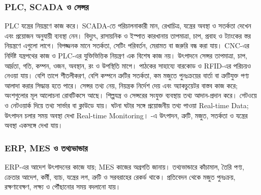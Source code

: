 \subsubsection{PLC, SCADA ও সেন্সর}
PLC যন্ত্রের নিয়ন্ত্রণে কাজ করে। SCADA-তে পরিচালনাকারী মান, রেখাচিত্র, যন্ত্রের অবস্থা ও সতর্কতা দেখেন এবং প্রয়োজন অনুযায়ী ব্যবস্থা নেন। বিদ্যুৎ, রাসায়নিক ও ইস্পাত কারখানায় তাপমাত্রা, চাপ, প্রবাহ ও ট্যাংকের স্তর নিয়ন্ত্রণে এগুলো লাগে। বিপজ্জনক মানে সতর্কতা, সেটিং পরিবর্তন, মেরামত বা জরুরি বন্ধ করা যায়। CNC-এর নির্দিষ্ট যন্ত্রপথের কাজ ও PLC-এর যুক্তিভিত্তিক নিয়ন্ত্রণ এক বিশেষ কাজ নয়।
উৎপাদনে সেন্সর তাপমাত্রা, চাপ, আর্দ্রতা, গতি, কম্পন, ওজন, অবস্থান, রং ও উপস্থিতি মাপে। পাঠকের সাহায্যে বারকোড ও RFID-এর পরিচয়ও নেওয়া যায়। বেশি তাপে শীতলীকরণ, বেশি কম্পনে ত্রুটির সতর্কতা, কম মজুতে পুনঃক্রয়ের বার্তা বা ত্রুটিযুক্ত পণ্য আলাদা করার সিদ্ধান্ত হতে পারে। সেন্সর তথ্য নেয়, নিয়ন্ত্রক নির্দেশ দেয় এবং অ্যাকচুয়েটর বাস্তব কাজ করে; অংশগুলোর মূল আলোচনা রোবটিকসে আছে।
 শিল্পযন্ত্র ও সেন্সরের সংযুক্ত ব্যবস্থায় তথ্য আদান-প্রদান করে। গেটওয়ে ও নেটওয়ার্ক দিয়ে তথ্য সার্ভার বা ক্লাউডে যায়। ঘটনা ঘটার সঙ্গে প্রয়োজনীয় তথ্য পাওয়া Real-time Data; উৎপাদন চলার সময় অবস্থা দেখা Real-time Monitoring। -এ উৎপাদন, ত্রুটি, মজুত, সতর্কতা ও যন্ত্রের অবস্থা একসঙ্গে দেখা যায়।
\subsubsection{ERP, MES ও তথ্যভান্ডার}
ERP-এর আদেশ উৎপাদনের কাজে যায়; MES কাজের অগ্রগতি জানায়। তথ্যভান্ডারে কাঁচামাল, তৈরি পণ্য, ক্রেতার আদেশ, কর্মী, ব্যাচ, যন্ত্রের লগ, ত্রুটি ও সরবরাহের রেকর্ড থাকে। প্রতিবেদন থেকে মজুত পুনঃক্রয়, রক্ষণাবেক্ষণ, লক্ষ্য ও পৌঁছানোর সময় বদলানো যায়।
